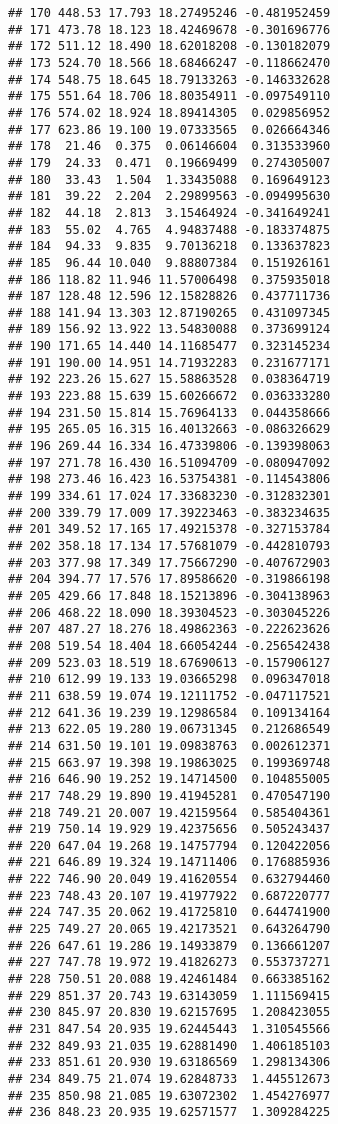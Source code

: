 \documentclass[]{book}
\theoremstyle{definition}
\theoremstyle{definition}
\theoremstyle{definition}
\theoremstyle{remark}
\begin{document}
\begin{verbatim}
## 170 448.53 17.793 18.27495246 -0.481952459
## 171 473.78 18.123 18.42469678 -0.301696776
## 172 511.12 18.490 18.62018208 -0.130182079
## 173 524.70 18.566 18.68466247 -0.118662470
## 174 548.75 18.645 18.79133263 -0.146332628
## 175 551.64 18.706 18.80354911 -0.097549110
## 176 574.02 18.924 18.89414305  0.029856952
## 177 623.86 19.100 19.07333565  0.026664346
## 178  21.46  0.375  0.06146604  0.313533960
## 179  24.33  0.471  0.19669499  0.274305007
## 180  33.43  1.504  1.33435088  0.169649123
## 181  39.22  2.204  2.29899563 -0.094995630
## 182  44.18  2.813  3.15464924 -0.341649241
## 183  55.02  4.765  4.94837488 -0.183374875
## 184  94.33  9.835  9.70136218  0.133637823
## 185  96.44 10.040  9.88807384  0.151926161
## 186 118.82 11.946 11.57006498  0.375935018
## 187 128.48 12.596 12.15828826  0.437711736
## 188 141.94 13.303 12.87190265  0.431097345
## 189 156.92 13.922 13.54830088  0.373699124
## 190 171.65 14.440 14.11685477  0.323145234
## 191 190.00 14.951 14.71932283  0.231677171
## 192 223.26 15.627 15.58863528  0.038364719
## 193 223.88 15.639 15.60266672  0.036333280
## 194 231.50 15.814 15.76964133  0.044358666
## 195 265.05 16.315 16.40132663 -0.086326629
## 196 269.44 16.334 16.47339806 -0.139398063
## 197 271.78 16.430 16.51094709 -0.080947092
## 198 273.46 16.423 16.53754381 -0.114543806
## 199 334.61 17.024 17.33683230 -0.312832301
## 200 339.79 17.009 17.39223463 -0.383234635
## 201 349.52 17.165 17.49215378 -0.327153784
## 202 358.18 17.134 17.57681079 -0.442810793
## 203 377.98 17.349 17.75667290 -0.407672903
## 204 394.77 17.576 17.89586620 -0.319866198
## 205 429.66 17.848 18.15213896 -0.304138963
## 206 468.22 18.090 18.39304523 -0.303045226
## 207 487.27 18.276 18.49862363 -0.222623626
## 208 519.54 18.404 18.66054244 -0.256542438
## 209 523.03 18.519 18.67690613 -0.157906127
## 210 612.99 19.133 19.03665298  0.096347018
## 211 638.59 19.074 19.12111752 -0.047117521
## 212 641.36 19.239 19.12986584  0.109134164
## 213 622.05 19.280 19.06731345  0.212686549
## 214 631.50 19.101 19.09838763  0.002612371
## 215 663.97 19.398 19.19863025  0.199369748
## 216 646.90 19.252 19.14714500  0.104855005
## 217 748.29 19.890 19.41945281  0.470547190
## 218 749.21 20.007 19.42159564  0.585404361
## 219 750.14 19.929 19.42375656  0.505243437
## 220 647.04 19.268 19.14757794  0.120422056
## 221 646.89 19.324 19.14711406  0.176885936
## 222 746.90 20.049 19.41620554  0.632794460
## 223 748.43 20.107 19.41977922  0.687220777
## 224 747.35 20.062 19.41725810  0.644741900
## 225 749.27 20.065 19.42173521  0.643264790
## 226 647.61 19.286 19.14933879  0.136661207
## 227 747.78 19.972 19.41826273  0.553737271
## 228 750.51 20.088 19.42461484  0.663385162
## 229 851.37 20.743 19.63143059  1.111569415
## 230 845.97 20.830 19.62157695  1.208423055
## 231 847.54 20.935 19.62445443  1.310545566
## 232 849.93 21.035 19.62881490  1.406185103
## 233 851.61 20.930 19.63186569  1.298134306
## 234 849.75 21.074 19.62848733  1.445512673
## 235 850.98 21.085 19.63072302  1.454276977
## 236 848.23 20.935 19.62571577  1.309284225
\end{verbatim}
\end{document}

